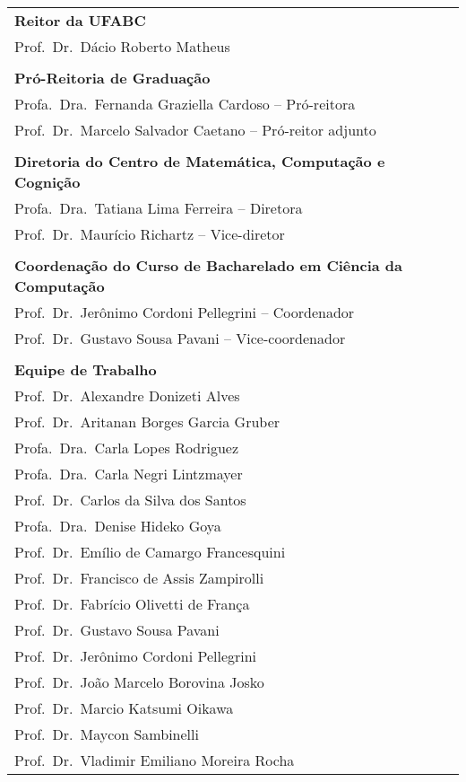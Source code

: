 \documentclass[a4paper]{article}
\begin{document}
\begin{tabular}{l}
    \textbf{Reitor da UFABC}\\
    Prof.\ Dr.\ Dácio Roberto Matheus\\
    \\
    \textbf{Pró-Reitoria de Graduação}\\
    Profa.\ Dra.\ Fernanda Graziella Cardoso -- Pró-reitora\\
    Prof.\ Dr.\ Marcelo Salvador Caetano -- Pró-reitor adjunto\\
    \\
    \textbf{Diretoria do Centro de Matemática, Computação e Cognição}\\
    Profa.\ Dra.\ Tatiana Lima Ferreira -- Diretora\\
    Prof.\ Dr.\ Maurício Richartz -- Vice-diretor\\
    \\
    \textbf{Coordenação do Curso de Bacharelado em Ciência da Computação}\\
    Prof.\ Dr.\ Jerônimo Cordoni Pellegrini -- Coordenador\\
    Prof.\ Dr.\ Gustavo Sousa Pavani -- Vice-coordenador\\
    \\
    \textbf{Equipe de Trabalho}\\
    Prof.\ Dr.\ Alexandre Donizeti Alves\\
    Prof.\ Dr.\ Aritanan Borges Garcia Gruber\\
    Profa.\ Dra.\ Carla Lopes Rodriguez\\
    Profa.\ Dra.\ Carla Negri Lintzmayer\\
    Prof.\ Dr.\ Carlos da Silva dos Santos\\
    Profa.\ Dra.\ Denise Hideko Goya\\
    Prof.\ Dr.\ Emílio de Camargo Francesquini\\
    Prof.\ Dr.\ Francisco de Assis Zampirolli\\
    Prof.\ Dr.\ Fabrício Olivetti de França\\
    Prof.\ Dr.\ Gustavo Sousa Pavani\\
    Prof.\ Dr.\ Jerônimo Cordoni Pellegrini\\
    Prof.\ Dr.\ João Marcelo Borovina Josko\\
    Prof.\ Dr.\ Marcio Katsumi Oikawa\\
    Prof.\ Dr.\ Maycon Sambinelli\\
    Prof.\ Dr.\ Vladimir Emiliano Moreira Rocha\\
\end{tabular}
\end{document}
